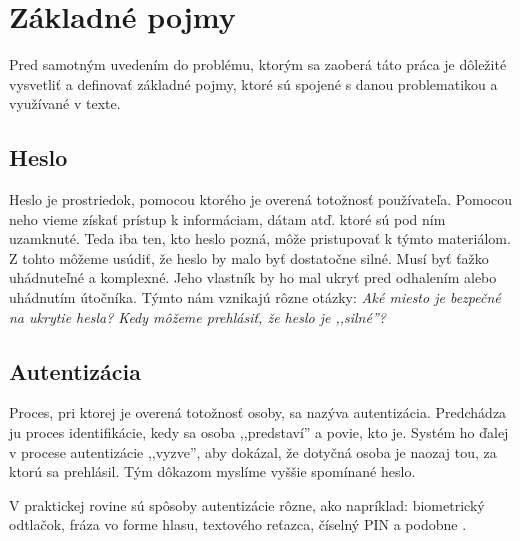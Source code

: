 \section{Základné pojmy}
Pred samotným uvedením do problému, ktorým sa zaoberá táto práca je dôležité vysvetliť a definovať základné pojmy, ktoré sú spojené s danou problematikou a využívané v texte. 

\subsection{Heslo}
Heslo je prostriedok, pomocou ktorého je overená totožnosť používateľa. \cite{1} Pomocou neho vieme získať prístup k informáciam, dátam atď. ktoré sú pod ním uzamknuté. Teda iba ten, kto heslo pozná, môže pristupovať k týmto materiálom. Z tohto môžeme usúdiť, že heslo by malo byť dostatočne silné. Musí byť ťažko uhádnuteľné a komplexné. Jeho vlastník by ho mal ukryť pred odhalením alebo uhádnutím útočníka. Týmto nám vznikajú rôzne otázky: \textit{Aké miesto je bezpečné na ukrytie hesla? Kedy môžeme prehlásiť, že heslo je ,,silné''?}

\subsection{Autentizácia}
Proces, pri ktorej je overená totožnosť osoby, sa nazýva autentizácia. Predchádza ju proces identifikácie, kedy sa osoba ,,predstaví'' a povie, kto je. Systém ho ďalej v procese autentizácie ,,vyzve'', aby dokázal, že dotyčná osoba je naozaj tou, za ktorú sa prehlásil. Tým dôkazom myslíme vyššie spomínané heslo. \cite{2}
\par V praktickej rovine sú spôsoby autentizácie rôzne, ako napríklad: biometrický odtlačok, fráza vo forme hlasu, textového reťazca, číselný PIN a podobne \cite{3}. 

